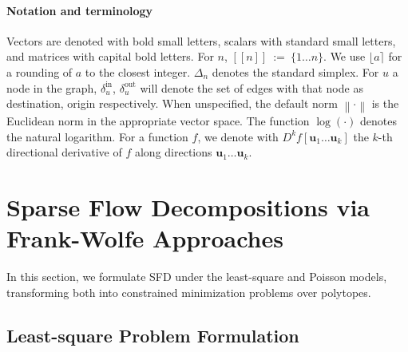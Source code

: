 \documentclass{ecai}
\newcommand{\norm}[1]{\left\| #1 \right\|}
\newcommand{\vu}{\mathbf{u}}
\newcommand{\interval}[1]{ [\![  #1 ]\!]}
\newcommand{\intround}[1]{ \lfloor #1 \rceil }
\begin{document}
\paragraph*{Notation and terminology\\}
Vectors are denoted with bold small letters, scalars with standard small letters, and matrices with capital bold letters.
For $n$, $\interval{n} \ \mathrm{:=}\  \{1\dots n\}$. We use $\intround{a}$ for a rounding of $a$ to the closest integer.
$\Delta_n$ denotes the standard simplex. For $u$ a node in the graph, $\delta^{\mathrm{in}}_u$, $\delta^{\mathrm{out}}_u$ will denote the set of edges with that node as destination, origin respectively.
When unspecified, the default norm $\norm{ \cdot }$ is the Euclidean norm in the appropriate vector space. The function $\log(\cdot)$ denotes the natural logarithm.
For a function $f$, we denote with $D^k f[\vu_1\dots\vu_k]$ the $k$-th directional derivative of $f$ along directions $\vu_1\dots \vu_k$.

\section{Sparse Flow Decompositions via Frank-Wolfe Approaches}

In this section, we formulate SFD under the least-square and Poisson models, transforming both into constrained minimization problems over polytopes.

\subsection{Least-square Problem Formulation}\label{sec:prbformulation}
\end{document}
